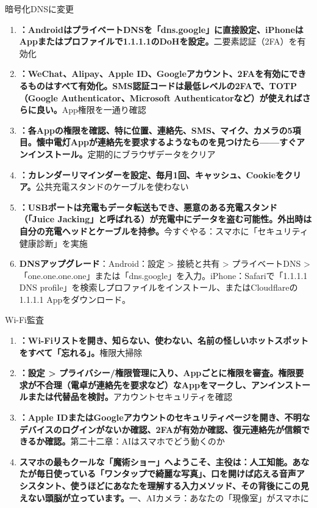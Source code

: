 
暗号化DNSに変更

\begin{enumerate}
  \item \textbf{：AndroidはプライベートDNSを「dns.google」に直接設定、iPhoneはAppまたはプロファイルで1.1.1.1のDoHを設定。}二要素認証（2FA）を有効化
  \item \textbf{：WeChat、Alipay、Apple ID、Googleアカウント、2FAを有効にできるものはすべて有効化。SMS認証コードは最低レベルの2FAで、TOTP（Google Authenticator、Microsoft Authenticatorなど）が使えればさらに良い。}App権限を一通り確認
  \item \textbf{：各Appの権限を確認、特に位置、連絡先、SMS、マイク、カメラの5項目。懐中電灯Appが連絡先を要求するようなものを見つけたら——すぐアンインストール。}定期的にブラウザデータをクリア
  \item \textbf{：カレンダーリマインダーを設定、毎月1回、キャッシュ、Cookieをクリア。}公共充電スタンドのケーブルを使わない
  \item \textbf{：USBポートは充電もデータ転送もでき、悪意のある充電スタンド（「Juice Jacking」と呼ばれる）が充電中にデータを盗む可能性。外出時は自分の充電ヘッドとケーブルを持参。}今すぐやる：スマホに「セキュリティ健康診断」を実施
  \item \textbf{DNSアップグレード}：Android：設定 > 接続と共有 > プライベートDNS > 「one.one.one.one」または「dns.google」を入力。iPhone：Safariで「1.1.1.1 DNS profile」を検索しプロファイルをインストール、またはCloudflareの1.1.1.1 Appをダウンロード。
\end{enumerate}

\begin{tcbpractice}{Wi-Fi監査}
\begin{enumerate}
  \item \textbf{：Wi-Fiリストを開き、知らない、使わない、名前の怪しいホットスポットをすべて「忘れる」。}権限大掃除
  \item \textbf{：設定 > プライバシー/権限管理に入り、Appごとに権限を審査。権限要求が不合理（電卓が連絡先を要求など）なAppをマークし、アンインストールまたは代替品を検討。}アカウントセキュリティを確認
  \item \textbf{：Apple IDまたはGoogleアカウントのセキュリティページを開き、不明なデバイスのログインがないか確認、2FAが有効か確認、復元連絡先が信頼できるか確認。}第二十二章：AIはスマホでどう動くのか
  \item \textbf{スマホの最もクールな「魔術ショー」へようこそ、主役は：人工知能。あなたが毎日使っている「ワンタップで綺麗な写真」、口を開けば応える音声アシスタント、使うほどにあなたを理解する入力メソッド、その背後にこの見えない頭脳が立っています。}一、AIカメラ：あなたの「現像室」がスマホに
\end{enumerate}

\end{tcbpractice}
